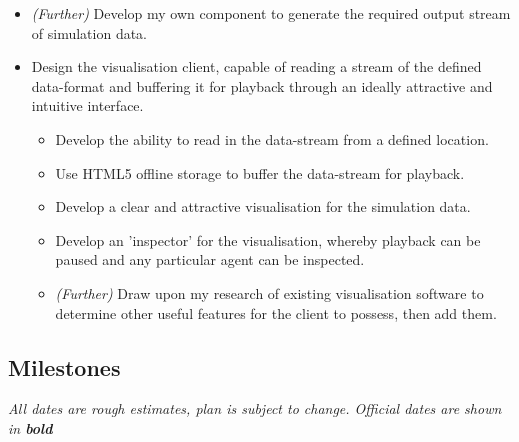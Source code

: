 \documentclass[a4paper]{article}
\begin{document}
\begin{itemize}
\begin{itemize}
					\end{itemize}

				\item \textit{(Further)} Develop my own component to generate the required output stream of simulation data.

				\item Design the visualisation client, capable of reading a stream of the defined data-format and buffering it for playback through an ideally attractive and intuitive interface.

					\begin{itemize}

						\item Develop the ability to read in the data-stream from a defined location.
						\item Use \textsc{HTML5} offline storage to buffer the data-stream for playback.
						\item Develop a clear and attractive visualisation for the simulation data.
						\item Develop an 'inspector' for the visualisation, whereby playback can be paused and any particular agent can be inspected.
						\item \textit{(Further)} Draw upon my research of existing visualisation software to determine other useful features for the client to possess, then add them.

					\end{itemize}

			\end{itemize}

			\vfill

		\subsection{Milestones}

			\textit{\small{All dates are rough estimates, plan is subject to change. Official dates are shown in \textbf{bold}}}\\
\end{document}
